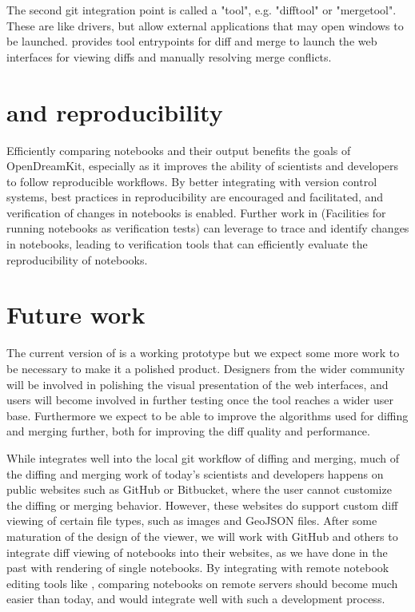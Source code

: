 \documentclass{deliverablereport}
\begin{document}
The second git integration point is called a "tool", e.g. "difftool" or "mergetool".
These are like drivers, but allow external applications that may open windows to be launched.
\nbdime provides tool entrypoints for diff and merge to launch the web interfaces for viewing diffs
and manually resolving merge conflicts.


\section{\nbdime and reproducibility} %
\label{sec:nbdime_and_reproducibility}

Efficiently comparing notebooks and their output benefits the goals of OpenDreamKit,
especially as it improves the ability of scientists and developers to follow reproducible workflows.
By better integrating with version control systems,
best practices in reproducibility are encouraged and facilitated,
and verification of changes in notebooks is enabled.
Further work in  (Facilities for running notebooks as verification tests)
can leverage \nbdime to trace and identify changes in notebooks,
leading to verification tools that can efficiently evaluate the reproducibility of notebooks.

\section{Future work}

The current version of \nbdime is a working prototype but we expect
some more work to be necessary to make it a polished product.
Designers from the wider \Jupyter community will be involved in
polishing the visual presentation of the web interfaces,
and users will become involved in further testing once the tool
reaches a wider user base. Furthermore we expect to be able to
improve the algorithms used for diffing and merging further,
both for improving the diff quality and performance.

While \nbdime integrates well into the local git workflow of diffing
and merging, much of the diffing and merging work of today's
scientists and developers happens on public websites such as GitHub or
Bitbucket, where the user cannot customize the diffing or merging
behavior.  However, these websites do support custom diff viewing of
certain file types, such as images and GeoJSON files.  After some
maturation of the design of the  viewer, we
will work with GitHub and others to integrate diff viewing of
notebooks into their websites, as we have done in the past with
rendering of single notebooks.  By integrating \nbdime with remote
notebook editing tools like , comparing notebooks
on remote servers should become much easier than today, and would
integrate well with such a development process.
\end{document}
